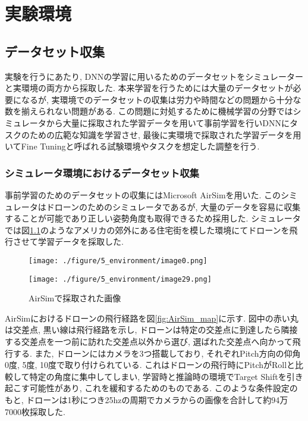 \chapter{実験環境}

\section{データセット収集}
実験を行うにあたり, DNNの学習に用いるためのデータセットをシミュレーターと実環境の両方から採取した. 本来学習を行うためには大量のデータセットが必要になるが, 実環境でのデータセットの収集は労力や時間などの問題から十分な数を揃えられない問題がある. この問題に対処するために機械学習の分野ではシミュレータから大量に採取された学習データを用いて事前学習を行いDNNにタスクのための広範な知識を学習させ, 最後に実環境で採取された学習データを用いてFine Tuning\cite{Fine_Tuning_paper}と呼ばれる試験環境やタスクを想定した調整を行う.

\subsection{シミュレータ環境におけるデータセット収集}\label{sec:correction_AirSim}
事前学習のためのデータセットの収集にはMicrosoft AirSim\cite{AirSim_paper}を用いた. このシミュレータはドローンのためのシミュレータであるが, 大量のデータを容易に収集することが可能であり正しい姿勢角度も取得できるため採用した. シミュレータでは図\ref{fig:AirSim_image}のようなアメリカの郊外にある住宅街を模した環境にてドローンを飛行させて学習データを採取した.

\begin{figure}[htbp]
  \begin{minipage}[b]{0.5\linewidth}
    \centering
    \texttt{[image: ./figure/5\_environment/image0.png]}
  \end{minipage}
  \begin{minipage}[b]{0.5\linewidth}
    \centering
    \texttt{[image: ./figure/5\_environment/image29.png]}
  \end{minipage}
  \caption{AirSimで採取された画像}\label{fig:AirSim_image}
\end{figure}

AirSimにおけるドローンの飛行経路を図\ref{fig:AirSim_map}に示す. 図中の赤い丸は交差点, 黒い線は飛行経路を示し, ドローンは特定の交差点に到達したら隣接する交差点を一つ前に訪れた交差点以外から選び, 選ばれた交差点へ向かって飛行する. また, ドローンにはカメラを3つ搭載しており, それぞれPitch方向の仰角0度, 5度, 10度で取り付けられている. これはドローンの飛行時にPitchがRollと比較して特定の角度に集中してしまい, 学習時と推論時の環境でTarget Shift\cite{Target_Shift_paper}を引き起こす可能性があり, これを緩和するためのものである. このような条件設定のもと, ドローンは1秒につき25hzの周期でカメラからの画像を合計して約94万7000枚採取した.

